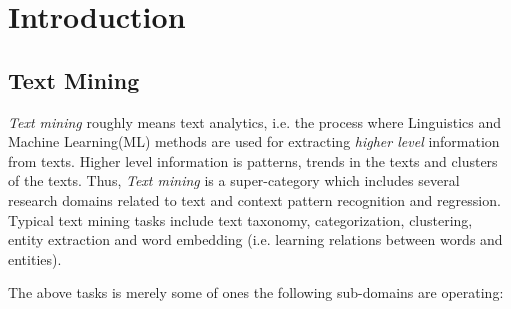 
\chapter{Introduction}

\label{chap:introduction}


\newcommand{\keyword}[1]{\textbf{#1}}
\newcommand{\tabhead}[1]{\textbf{#1}}
\newcommand{\code}[1]{\texttt{#1}}
\newcommand{\file}[1]{\texttt{\bfseries#1}}
\newcommand{\option}[1]{\texttt{\itshape#1}}


\section{Text Mining} \label{chap:introduction:sec:text_mining}

\textit{Text mining} roughly means text analytics, i.e. the process where Linguistics and Machine Learning(ML) methods are used for extracting \textit{higher level} information from texts. Higher level information is patterns, trends in the texts and clusters of the texts. Thus, \textit{Text mining} is a super-category which includes several research domains related to text and context pattern recognition and regression. Typical text mining tasks include text taxonomy, categorization, clustering, entity extraction and word embedding (i.e. learning relations between words and entities).

The above tasks is merely some of ones the following sub-domains are operating: 


